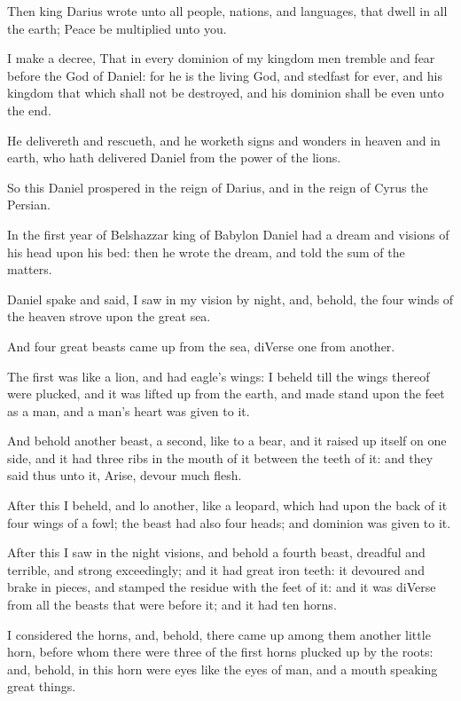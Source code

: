 \Verse Then king Darius wrote unto all people, nations, and languages, that dwell in all the earth; Peace be multiplied unto you.

\Verse I make a decree, That in every dominion of my kingdom men tremble and fear before the God of Daniel: for he is the living God, and stedfast for ever, and his kingdom that which shall not be destroyed, and his dominion shall be even unto the end.

\Verse He delivereth and rescueth, and he worketh signs and wonders in heaven and in earth, who hath delivered Daniel from the power of the lions.

\Verse So this Daniel prospered in the reign of Darius, and in the reign of Cyrus the Persian.


\Chapter
\Verse In the first year of Belshazzar king of Babylon Daniel had a dream and visions of his head upon his bed: then he wrote the dream, and told the sum of the matters.

\Verse Daniel spake and said, I saw in my vision by night, and, behold, the four winds of the heaven strove upon the great sea.

\Verse And four great beasts came up from the sea, diVerse one from another.

\Verse The first was like a lion, and had eagle's wings: I beheld till the wings thereof were plucked, and it was lifted up from the earth, and made stand upon the feet as a man, and a man's heart was given to it.

\Verse And behold another beast, a second, like to a bear, and it raised up itself on one side, and it had three ribs in the mouth of it between the teeth of it: and they said thus unto it, Arise, devour much flesh.

\Verse After this I beheld, and lo another, like a leopard, which had upon the back of it four wings of a fowl; the beast had also four heads; and dominion was given to it.

\Verse After this I saw in the night visions, and behold a fourth beast, dreadful and terrible, and strong exceedingly; and it had great iron teeth: it devoured and brake in pieces, and stamped the residue with the feet of it: and it was diVerse from all the beasts that were before it; and it had ten horns.

\Verse I considered the horns, and, behold, there came up among them another little horn, before whom there were three of the first horns plucked up by the roots: and, behold, in this horn were eyes like the eyes of man, and a mouth speaking great things.

